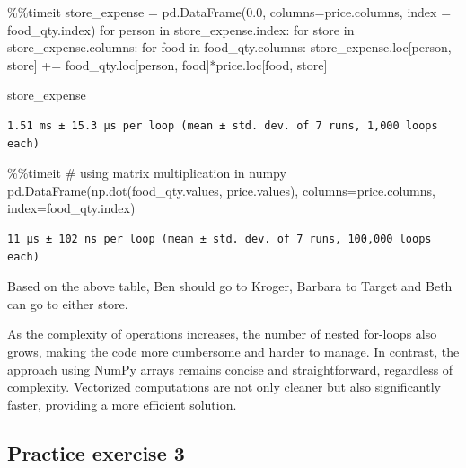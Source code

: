 \documentclass[
  letterpaper,
  DIV=11,
  numbers=noendperiod]{scrreprt}
\newenvironment{Shaded}{\begin{snugshade}}{\end{snugshade}}
\newcommand{\CommentTok}[1]{\textcolor[rgb]{0.37,0.37,0.37}{#1}}
\newcommand{\ControlFlowTok}[1]{\textcolor[rgb]{0.00,0.23,0.31}{#1}}
\newcommand{\FloatTok}[1]{\textcolor[rgb]{0.68,0.00,0.00}{#1}}
\newcommand{\KeywordTok}[1]{\textcolor[rgb]{0.00,0.23,0.31}{#1}}
\newcommand{\NormalTok}[1]{\textcolor[rgb]{0.00,0.23,0.31}{#1}}
\newcommand{\OperatorTok}[1]{\textcolor[rgb]{0.37,0.37,0.37}{#1}}
\begin{document}
\begin{Shaded}
\begin{Highlighting}[]
\OperatorTok{\%\%}\NormalTok{timeit}
\NormalTok{store\_expense }\OperatorTok{=}\NormalTok{ pd.DataFrame(}\FloatTok{0.0}\NormalTok{, columns}\OperatorTok{=}\NormalTok{price.columns, index }\OperatorTok{=}\NormalTok{ food\_qty.index)}
\ControlFlowTok{for}\NormalTok{ person }\KeywordTok{in}\NormalTok{ store\_expense.index:}
    \ControlFlowTok{for}\NormalTok{ store }\KeywordTok{in}\NormalTok{ store\_expense.columns:}
        \ControlFlowTok{for}\NormalTok{ food }\KeywordTok{in}\NormalTok{ food\_qty.columns:}
\NormalTok{            store\_expense.loc[person, store] }\OperatorTok{+=}\NormalTok{ food\_qty.loc[person, food]}\OperatorTok{*}\NormalTok{price.loc[food, store]}

\NormalTok{store\_expense}
\end{Highlighting}
\end{Shaded}

\begin{verbatim}
1.51 ms ± 15.3 μs per loop (mean ± std. dev. of 7 runs, 1,000 loops each)
\end{verbatim}

\begin{Shaded}
\begin{Highlighting}[]
\OperatorTok{\%\%}\NormalTok{timeit}
\CommentTok{\# using matrix multiplication in numpy}
\NormalTok{pd.DataFrame(np.dot(food\_qty.values, price.values), columns}\OperatorTok{=}\NormalTok{price.columns, index}\OperatorTok{=}\NormalTok{food\_qty.index)}
\end{Highlighting}
\end{Shaded}

\begin{verbatim}
11 μs ± 102 ns per loop (mean ± std. dev. of 7 runs, 100,000 loops each)
\end{verbatim}

Based on the above table, Ben should go to Kroger, Barbara to Target and
Beth can go to either store.

As the complexity of operations increases, the number of nested
for-loops also grows, making the code more cumbersome and harder to
manage. In contrast, the approach using NumPy arrays remains concise and
straightforward, regardless of complexity. Vectorized computations are
not only cleaner but also significantly faster, providing a more
efficient solution.

\hypertarget{practice-exercise-3-1}{%
\subsection{Practice exercise 3}\label{practice-exercise-3-1}}
\end{document}
